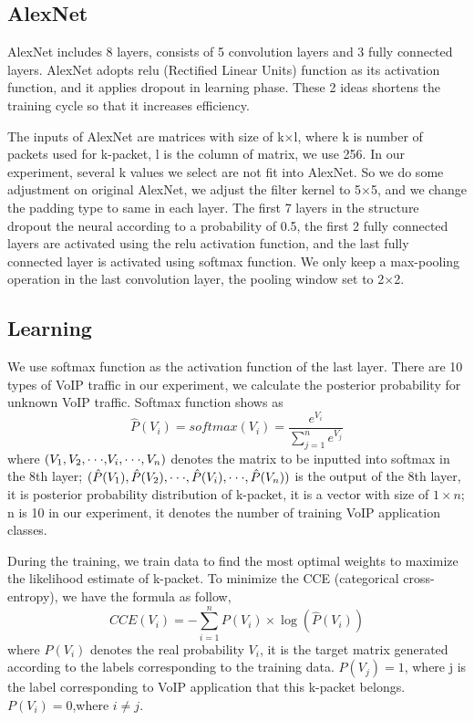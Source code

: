 \documentclass[conference]{IEEEtran}
\begin{document}
\subsection{AlexNet}
AlexNet includes 8 layers, consists of 5 convolution layers and 3 fully connected layers. AlexNet adopts relu (Rectified Linear Units) function as its activation function, and it applies dropout in learning phase. These 2 ideas shortens the training cycle so that it increases efficiency.

The inputs of AlexNet are matrices with size of k$\times$l, where k is number of packets used for k-packet, l is the column of matrix, we use 256. In our experiment, several k values we select are not fit into AlexNet. So we do some adjustment on original AlexNet, we adjust the filter kernel to 5$\times$5, and we change the padding type to same in each layer. The first 7 layers in the structure dropout the neural according to a probability of 0.5, the first 2 fully connected layers are activated using the relu activation function, and the last fully connected layer is activated using softmax function. We only keep a max-pooling operation in the last convolution layer, the pooling window set to 2$\times$2.
\subsection{Learning}
We use softmax function as the activation function of the last layer. There are 10 types of VoIP traffic in our experiment, we calculate the posterior probability for unknown VoIP traffic. Softmax function shows as
\begin{equation}
\hat P({V_i}) = softmax({V_i}) = \frac{{{e^{{V_i}}}}}{{\sum\limits_{j = 1}^n {{e^{{V_j}}}} }}
\end{equation}
where $({V_1},{V_2},{\rm{\cdot\cdot\cdot,}}{V_i},{\rm{\cdot\cdot\cdot}},{V_n})$ denotes the matrix to be inputted into softmax in the 8th layer; $(\hat P({V_1}),\hat P({V_2}),{\rm{\cdot\cdot\cdot}},\hat P({V_i}),{\rm{\cdot\cdot\cdot}},\hat P({V_n}))$ is the output of the 8th layer, it is posterior probability distribution of k-packet, it is a vector with size of $1 \times n$; n is 10 in our experiment, it denotes the number of training VoIP application classes.

During the training, we train data to find the most optimal weights to maximize the likelihood estimate of k-packet. To minimize the CCE (categorical cross-entropy), we have the formula as follow,
\begin{equation}
CCE({V_i}) =  - \sum\limits_{i = 1}^n {P({V_i}) \times \log (\hat P({V_i}))}
\end{equation}
where $P({V_i})$ denotes the real probability ${V_i}$, it is the target matrix generated according to the labels corresponding to the training data. $P({V_j})=1$, where j is the label corresponding to VoIP application that this k-packet belongs.$P({V_i})=0$,where $i \ne j$.
\end{document}
